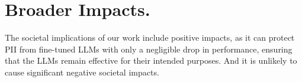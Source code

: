 \section{Broader Impacts.}
The societal implications of our work include positive impacts, as it can protect PII from fine-tuned LLMs with only a negligible drop in performance, ensuring that the LLMs remain effective for their intended purposes. And it is unlikely to cause significant negative societal impacts.